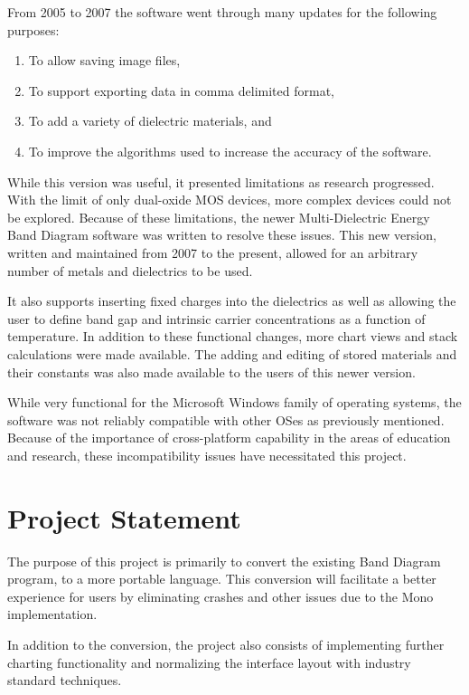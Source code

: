 \documentclass[project]{bsu-ms}
\begin{document}
From 2005 to 2007 the software went through many updates for the following purposes: 

\begin{enumerate}
\item To allow saving image files, 
\item To support exporting data in comma delimited format,
\item To add a variety of dielectric materials, and
\item To improve the algorithms used to increase the accuracy of the software.
\end{enumerate}

While this version was useful, it presented limitations as research progressed. With the limit of only dual-oxide MOS devices, more complex devices could not be explored. Because of these limitations, the newer Multi-Dielectric Energy Band Diagram software was written to resolve these issues\cite{band:paper2}. This new version, written and maintained from 2007 to the present, allowed for an arbitrary number of metals and dielectrics to be used.

It also supports inserting fixed charges into the dielectrics as well as allowing the user to define band gap and intrinsic carrier concentrations as a function of temperature. In addition to these functional changes, more chart views and stack calculations were made available. The adding and editing of stored materials and their constants was also made available to the users of this newer version.

While very functional for the Microsoft Windows family of operating systems, the software was not reliably compatible with other OSes as previously mentioned. Because of the importance of cross-platform capability in the areas of education and research, these incompatibility issues have necessitated this project.



\section{Project Statement}\label{sec:projectStatement}
The purpose of this project is primarily to convert the existing Band Diagram program, to a more portable language. This conversion will facilitate a better experience for users by eliminating crashes and other issues due to the Mono implementation. 

In addition to the conversion, the project also consists of implementing further charting functionality and normalizing the interface layout with industry standard techniques.
\end{document}
